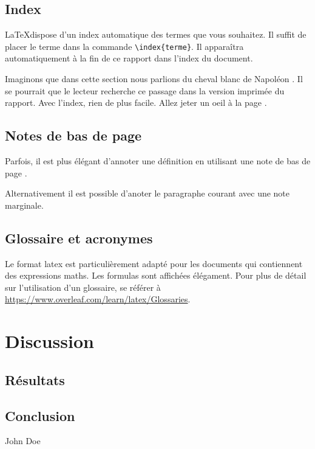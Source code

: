 \documentclass{heig-tb}
\begin{document}
\section{Index}
\LaTeX dispose d'un index automatique des termes  que vous souhaitez. Il suffit de placer le terme dans la commande \texttt{\textbackslash index\{terme\}}. Il apparaîtra automatiquement à la fin de ce rapport dans l'index du document.

Imaginons que dans cette section nous parlions du cheval blanc  de Napoléon . Il se pourrait que le lecteur recherche ce passage dans la version imprimée du rapport. Avec l'index, rien de plus facile. Allez jeter un oeil à la page \pageref{index}.

\section{Notes de bas de page}

Parfois, il est plus élégant d'annoter une définition en utilisant une note de bas de page \footnotemark.

Alternativement il est possible d'anoter le paragraphe courant avec une note marginale. 


\section{Glossaire et acronymes}

Le format \Gls{latex} est particulièrement adapté pour les documents qui contiennent des expressions \gls{maths}. Les \Glspl{formula} sont affichées élégament. Pour plus de détail sur l'utilisation d'un glossaire, se référer à \url{https://www.overleaf.com/learn/latex/Glossaries}.

\chapter{Discussion}
\section{Résultats}

\lipsum[10]

\section{Conclusion}

\lipsum[11]

\hspace{7cm}John Doe\par
\hspace{7cm}\begin{minipage}{5cm}

\end{minipage}

\clearpage

\appendix
\appendixpage
\addappheadtotoc



\backmatter


\printglossary
\printbibliography
\label{index}
\printindex
\end{document}
